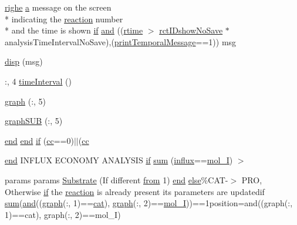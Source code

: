 \begin{DoxyCompactItemize}
\hyperlink{a00066_abdf49e297e2c121f2d09f075ac3d518a}{righe} \hyperlink{a00035_a2ffdbad9ea59541e59cbd2b938e0770c}{a} message on the screen \\*
indicating the \hyperlink{a00028_a4ba2ecb46f808729569ecce2cc1d34c6}{reaction} number \\*
and the time is shown \hyperlink{a00030_a01d55766b8058903dd360b4bda71f9f5}{if} \hyperlink{a00028_a170f8acb213f91bf71c77b1d20bceb33}{and} ((\hyperlink{a00028_afc6b38657a313b9f1de2ee356910b6ee}{rtime} $>$ \hyperlink{a00028_aeb449dcc9eb8bfe0321b031e10962ac5}{rct\-I\-Dshow\-No\-Save} $\ast$analysis\-Time\-Interval\-No\-Save),(\hyperlink{a00028_acc16e80f122cc11cf1570c53597afb19}{print\-Temporal\-Message}==1)) msg
\item 
\hyperlink{a00028_a107ac08fa413d7d0c5323dc4330d83fb}{disp} (msg)
\item 
\-:, 4 \hyperlink{a00028_a430673c9821c17e4bf93cd42f59e00bb}{time\-Interval} ()
\item 
\hyperlink{a00028_a06db733746591db2e7af550e39737769}{graph} (\-:, 5)
\item 
\hyperlink{a00028_a0dcc86024488689bb64656babb50789c}{graph\-S\-U\-B} (\-:, 5)
\item 
\hyperlink{a00025_afb358f48b1646c750fb9da6c6585be2b}{end} \hyperlink{a00025_afb358f48b1646c750fb9da6c6585be2b}{end} \hyperlink{a00028_a69389e83631699e80408490e48a695b0}{if} (\hyperlink{a00028_afb5980388a6e55ca55437b53cdaf528a}{cc}==0)$|$$|$(\hyperlink{a00028_afb5980388a6e55ca55437b53cdaf528a}{cc}
\item 
\hyperlink{a00025_afb358f48b1646c750fb9da6c6585be2b}{end} I\-N\-F\-L\-U\-X E\-C\-O\-N\-O\-M\-Y A\-N\-A\-L\-Y\-S\-I\-S \hyperlink{a00030_a01d55766b8058903dd360b4bda71f9f5}{if} \hyperlink{a00028_a576bebae86b11914280920c448def53d}{sum} (\hyperlink{a00065_a902e747aeec6b345d3a057099152f41f}{influx}==\hyperlink{a00028_ab346189eef5359a07ba32144ddcd4465}{mol\-\_\-\-I}) $>$
\item 
params params \hyperlink{a00028_a933446706261d8afb3d9cb88a769aa2b}{Substrate} (If different \hyperlink{a00028_aa7b4fe13e75a69fca72862effeaf6196}{from} 1) \hyperlink{a00025_afb358f48b1646c750fb9da6c6585be2b}{end} \hyperlink{a00031_af5946383720aa572eb93e1e63afc23c2}{else}\%C\-A\-T-\/$>$ P\-R\-O, Otherwise \hyperlink{a00030_a01d55766b8058903dd360b4bda71f9f5}{if} the \hyperlink{a00028_a4ba2ecb46f808729569ecce2cc1d34c6}{reaction} is already present its parameters are updatedif \hyperlink{a00064_a59a869fb2b28d56dacd91c09e1dffc8d}{sum}(\hyperlink{a00028_a170f8acb213f91bf71c77b1d20bceb33}{and}((\hyperlink{a00028_a2745e24fec2a44d51f4452beb1596bd3}{graph}(\-:, 1)==\hyperlink{a00028_a7073f71a43389f3032e69b1fffc2551a}{cat}), \hyperlink{a00028_a2745e24fec2a44d51f4452beb1596bd3}{graph}(\-:, 2)==\hyperlink{a00028_ab346189eef5359a07ba32144ddcd4465}{mol\-\_\-\-I}))==1position=and((graph(\-:, 1)==cat), graph(\-:, 2)==mol\-\_\-\-I)
$$
\end{DoxyCompactItemize}
